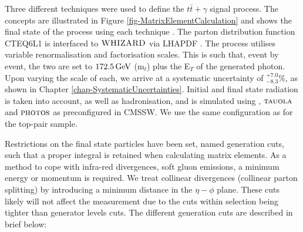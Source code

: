 Three different techniques were used to define the $t\bar{t}+\gamma$ signal process. The concepts are illustrated in Figure \ref{fig-MatrixElementCalculation} and shows the final state of the process using each technique \cite{heinerthesis}. The parton distribution function CTEQ6L1 \cite{Pumplin:2002vw} is interfaced to ${\textsc{WHIZARD}}$ via LHAPDF \cite{Whalley:2005nh}. The process utilises variable renormalisation and factorisation scales. This is such that, event by event, the two are set to $172.5 \,\text{Ge\hspace{-.08em}V}$ (m$_t$) plus the E$_T$ of the generated photon. Upon varying the scale of each, we arrive at a systematic uncertainty of $^{+7.0}_{-8.3}\%$, as shown in Chapter \ref{chap-SystematicUncertainties}. Initial and final state radiation is taken into account, as well as hadronisation, and is simulated using  \cite{Sjostrand:2006za}, $\textsc{tauola}$ and $\textsc{photos}$ \cite{Was:2006my} as preconfigured in CMSSW. We use the same configuration as for the top-pair sample.

Restrictions on the final state particles have been set, named generation cuts, such that a proper integral is retained when calculating matrix elements. As a method to cope with infra-red divergences, soft gluon emissions, a minimum energy or momentum is required. We treat collinear divergences (collinear parton splitting) by introducing a minimum distance in the $\eta - \phi$ plane. These cuts likely will not affect the measurement due to the cuts within selection being tighter than generator levels cuts. The different generation cuts are described in brief below:

